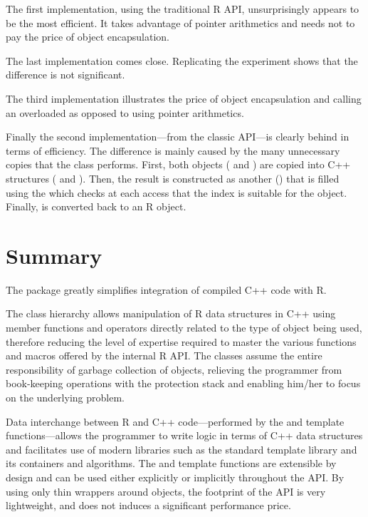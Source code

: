 The first implementation, using the traditional R API, unsurprisingly 
appears to be the most efficient. It takes advantage of pointer 
arithmetics and needs not to pay the price of object encapsulation. 

The last implementation comes close. Replicating the experiment
shows that the difference is not significant. 

The third implementation illustrates the price of object encapsulation
and calling an overloaded  as opposed to using 
pointer arithmetics.

Finally the second implementation---from the classic  API---is
clearly behind in terms of efficiency. The difference is mainly 
caused by the many unnecessary copies that the 
class performs. First, both objects ( and )
are copied into C++ structures ( and ). 
Then, the result is constructed as another 
() that is filled using the  which checks
at each access that the index is suitable for the object. Finally, 
is converted back to an R object. 

\section{Summary}

The  package greatly simplifies integration of compiled C++ code
with R. 

The class hierarchy allows manipulation of R data structures in C++ 
using member functions and operators directly related to the type
of object being used, therefore reducing the level of expertise
required to master the various functions and macros offered by the
internal R API. The classes assume the entire 
responsibility of garbage collection of objects, relieving the 
programmer from book-keeping operations with the protection stack 
and enabling him/her to focus on the underlying problem. 

Data interchange between R and C++ code---performed by the  and
 template functions---allows the programmer to write logic in terms
of C++ data structures and facilitates use of modern libraries such as the
standard template library and its containers and algorithms. The
 and  template functions are extensible by design and
can be used either explicitly or implicitly throughout the API.
By using only thin wrappers around  objects, 
the footprint of the  API is very lightweight, and does not 
induces a significant performance price. 


